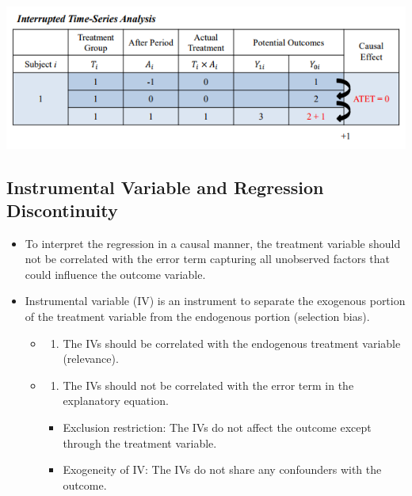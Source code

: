 \documentclass[
]{book}
\providecommand{\tightlist}{%
  \setlength{\itemsep}{0pt}\setlength{\parskip}{0pt}}
\theoremstyle{definition}
\theoremstyle{definition}
\theoremstyle{definition}
\theoremstyle{definition}
\theoremstyle{remark}
\begin{document}
\includegraphics{figures/30.png}

\hypertarget{instrumental-variable-and-regression-discontinuity}{%
\subsection{Instrumental Variable and Regression Discontinuity}\label{instrumental-variable-and-regression-discontinuity}}

\begin{itemize}
\item
  To interpret the regression in a causal manner, the treatment variable should not be correlated with the error term capturing all unobserved factors that could influence the outcome variable.
\item
  Instrumental variable (IV) is an instrument to separate the exogenous portion of the treatment variable from the endogenous portion (selection bias).

  \begin{itemize}
  \item
    \begin{enumerate}
    \def\labelenumi{(\arabic{enumi})}
    \tightlist
    \item
      The IVs should be correlated with the endogenous treatment variable (relevance).
    \end{enumerate}
  \item
    \begin{enumerate}
    \def\labelenumi{(\arabic{enumi})}
    \setcounter{enumi}{1}
    \tightlist
    \item
      The IVs should not be correlated with the error term in the explanatory equation.
    \end{enumerate}

    \begin{itemize}
    \tightlist
    \item
      Exclusion restriction: The IVs do not affect the outcome except through the treatment variable.
    \item
      Exogeneity of IV: The IVs do not share any confounders with the outcome.
    \end{itemize}
  \end{itemize}
\end{itemize}
\end{document}
